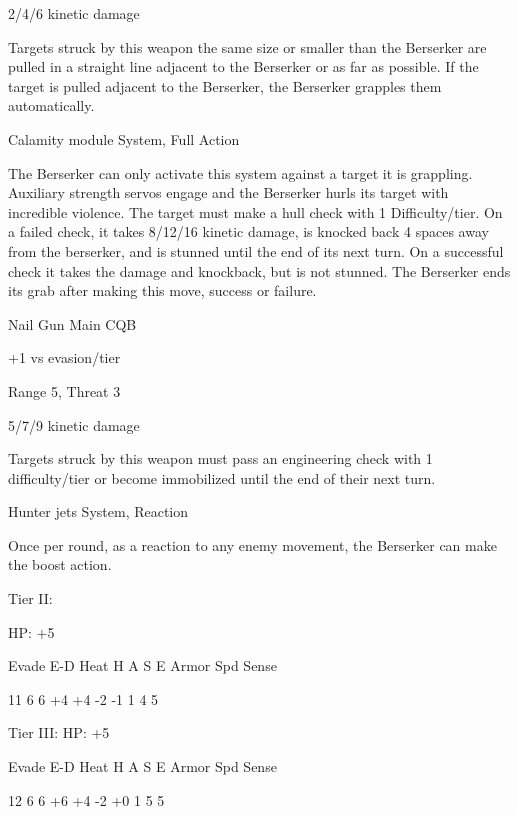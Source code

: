 2/4/6 kinetic damage

Targets struck by this weapon the same size or smaller than the Berserker are pulled in a straight
line adjacent to the Berserker or as far as possible. If the target is pulled adjacent to the
Berserker, the Berserker grapples them automatically.


Calamity module
System, Full Action

The Berserker can only activate this system against a target it is grappling. Auxiliary strength
servos engage and the Berserker hurls its target with incredible violence. The target must make a
hull check with 1 Difficulty/tier. On a failed check, it takes 8/12/16 kinetic damage, is knocked
back 4 spaces away from the berserker, and is stunned until the end of its next turn. On a
successful check it takes the damage and knockback, but is not stunned. The Berserker ends its
grab after making this move, success or failure.


Nail Gun
Main CQB

+1 vs evasion/tier

Range 5, Threat 3

5/7/9 kinetic damage

Targets struck by this weapon must pass an engineering check with 1 difficulty/tier or become
immobilized until the end of their next turn.


Hunter jets
System, Reaction

Once per round, as a reaction to any enemy movement, the Berserker can make the boost
action.


Tier II:

HP: +5


          Evade     E-D    Heat    H    A     S     E       Armor        Spd       Sense

          11       6      6        +4   +4    -2    -1       1           4         5

Tier III:
HP: +5


          Evade     E-D    Heat    H    A     S     E       Armor        Spd       Sense

          12       6      6        +6   +4    -2    +0       1           5         5
